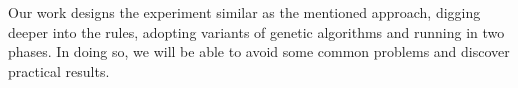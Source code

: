 \documentclass{article}
\begin{document}
Our work designs the experiment similar as the mentioned approach,
digging deeper into the rules, adopting variants of genetic algorithms and running in two phases.
In doing so, we will be able to avoid some common problems and discover practical results.










\end{document}
